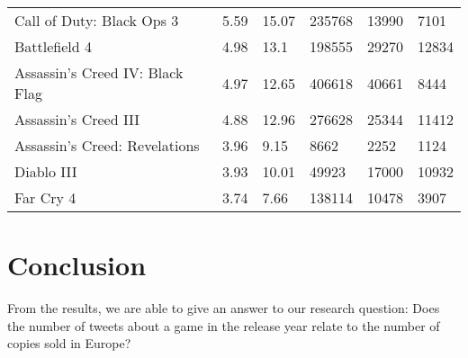 \begin{table*}[!ht]
\begin{tabular}{llllll}
		\multicolumn{1}{l|}{Call of Duty: Black Ops 3}       & 5.59            & 15.07          & 235768                & 13990                                                                            & 7101                                                                            \\
		\multicolumn{1}{l|}{Battlefield 4}                   & 4.98            & 13.1           & 198555                & 29270                                                                            & 12834                                                                           \\
		\multicolumn{1}{l|}{Assassin's Creed IV: Black Flag} & 4.97            & 12.65          & 406618                & 40661                                                                            & 8444                                                                            \\
		\multicolumn{1}{l|}{Assassin's Creed III}            & 4.88            & 12.96          & 276628                & 25344                                                                            & 11412                                                                           \\
		\multicolumn{1}{l|}{Assassin's Creed: Revelations}   & 3.96            & 9.15           & 8662                  & 2252                                                                             & 1124                                                                            \\
		\multicolumn{1}{l|}{Diablo III}                      & 3.93            & 10.01          & 49923                 & 17000                                                                            & 10932                                                                           \\
		\multicolumn{1}{l|}{Far Cry 4}                       & 3.74            & 7.66           & 138114                & 10478                                                                            & 3907                                                                           
	\end{tabular}
\end{table*}
\section{Conclusion}
From the results, we are able to give an answer to our research question: Does the number of tweets about a game in the release year relate to the number of copies sold in Europe?

